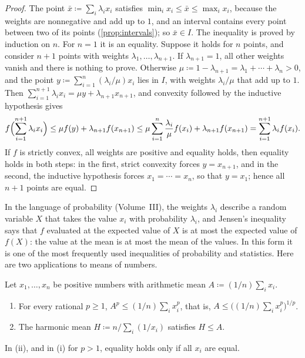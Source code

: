 \begin{proof}
The point $\bar x\coloneqq\sum_i\lambda_ix_i$ satisfies $\min_ix_i\le\bar x\le\max_ix_i$, because the weights are nonnegative and add up to $1$, and an interval contains every point between two of its points (\cref{prop:intervals}); so $\bar x\in I$. The inequality is proved by induction on $n$. For $n=1$ it is an equality. Suppose it holds for $n$ points, and consider $n+1$ points with weights $\lambda_1,\ldots,\lambda_{n+1}$. If $\lambda_{n+1}=1$, all other weights vanish and there is nothing to prove. Otherwise $\mu\coloneqq1-\lambda_{n+1}=\lambda_1+\cdots+\lambda_n>0$, and the point $y\coloneqq\sum_{i=1}^n(\lambda_i/\mu)x_i$ lies in $I$, with weights $\lambda_i/\mu$ that add up to $1$. Then $\sum_{i=1}^{n+1}\lambda_ix_i=\mu y+\lambda_{n+1}x_{n+1}$, and convexity followed by the inductive hypothesis gives
\[
f\Bigl(\sum_{i=1}^{n+1}\lambda_ix_i\Bigr)\le\mu f(y)+\lambda_{n+1}f(x_{n+1})\le\mu\sum_{i=1}^n\frac{\lambda_i}\mu f(x_i)+\lambda_{n+1}f(x_{n+1})=\sum_{i=1}^{n+1}\lambda_if(x_i).
\]
If $f$ is strictly convex, all weights are positive and equality holds, then equality holds in both steps: in the first, strict convexity forces $y=x_{n+1}$, and in the second, the inductive hypothesis forces $x_1=\cdots=x_n$, so that $y=x_1$; hence all $n+1$ points are equal.
\end{proof}

In the language of probability (Volume~III), the weights $\lambda_i$ describe a random variable $X$ that takes the value $x_i$ with probability $\lambda_i$, and Jensen's inequality says that $f$ evaluated at the expected value of $X$ is at most the expected value of $f(X)$: the value at the mean is at most the mean of the values. In this form it is one of the most frequently used inequalities of probability and statistics. Here are two applications to means of numbers.

\begin{corollary}
\label{cor:power-means}
Let $x_1,\ldots,x_n$ be positive numbers with arithmetic mean $A\coloneqq(1/n)\sum_ix_i$.
\begin{enumerate}
\item For every rational $p\ge1$, $A^p\le(1/n)\sum_ix_i^p$, that is, $A\le\bigl((1/n)\sum_ix_i^p\bigr)^{1/p}$.
\item The harmonic mean $H\coloneqq n\big/\sum_i(1/x_i)$ satisfies $H\le A$.
\end{enumerate}
In (ii), and in (i) for $p>1$, equality holds only if all $x_i$ are equal.
\end{corollary}

